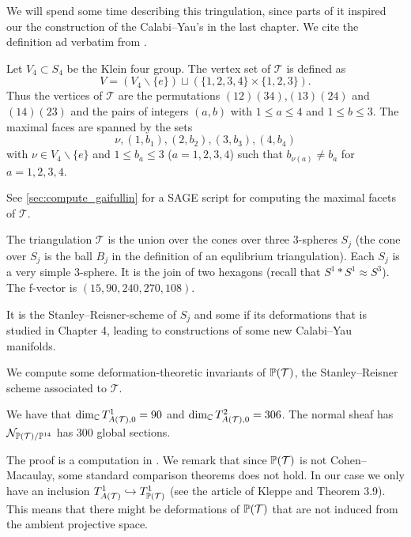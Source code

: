  We will spend some time describing this tringulation, since parts of it inspired our the construction of the Calabi--Yau's in the last chapter. We cite the definition ad verbatim from \cite{cp2_15_chess}. 

 \begin{definition}
 Let $V_4 \subset S_4$ be the Klein four group. The vertex set of $\mathcal T$ is defined as
 \begin{equation}
 V = (V_4 \backslash \{e \}) \sqcup \left( \{1,2,3,4 \} \times \{ 1,2,3 \} \right).
 \end{equation}
 Thus the vertices of $\mathcal T$ are the permutations $(12)(34)$,$(13)(24)$ and $(14)(23)$ and the pairs of integers $(a,b)$ with $1 \leq a \leq 4$ and $1 \leq b \leq 3$. The maximal faces are spanned by the sets 
 \begin{equation}
 \nu, (1,b_1), (2,b_2), (3,b_3), (4,b_4)
 \end{equation}
 with $\nu \in V_4 \backslash \{ e \}$ and $1 \leq b_a \leq 3$ ($a=1,2,3,4$) such that $b_{\nu(a)} \neq b_a$ for $a=1,2,3,4$.
 \end{definition}

See \cref{sec:compute_gaifullin} for a SAGE \cite{sagemath} script for computing the maximal facets of $\mathcal T$.

The triangulation $\mathcal T$ is the union over the cones over three $3$-spheres $S_j$ (the cone over $S_j$ is the ball $B_j$ in the definition of an equlibrium triangulation). Each $S_j$ is a very simple $3$-sphere. It is the join of two hexagons (recall that $S^1 \ast S^1 \approx S^3$). The f-vector is $(15,90,240,270,108)$.

It is the Stanley--Reisner-scheme of $S_j$ and some if its deformations that is studied in Chapter 4, leading to constructions of some new Calabi--Yau manifolds. 

We compute some deformation-theoretic invariants of $\P(\mathcal T)$, the Stanley--Reisner scheme associated to $\mathcal T$.

\begin{proposition}
We have that $\dim_\C  T^1_{A(\mathcal T),0}=90$ and $\dim_\C T^2_{A(\mathcal T),0}=306$. The normal sheaf has $\mathcal N_{\P(\mathcal T)/\P^{14}}$ has $300$ global sections.
\end{proposition}

The proof is a computation in \MM. We remark that since $\P(\mathcal T)$ is not Cohen--Macaulay, some standard comparison theorems does not hold. In our case we only have an inclusion $T^1_{A(\mathcal T)} \hookrightarrow T^1_{\P(\mathcal T)}$ (see the article of Kleppe \cite{kleppe_deformations} and Theorem 3.9). This means that there might be deformations of $\P(\mathcal T)$ that are not induced from the ambient projective space. 

